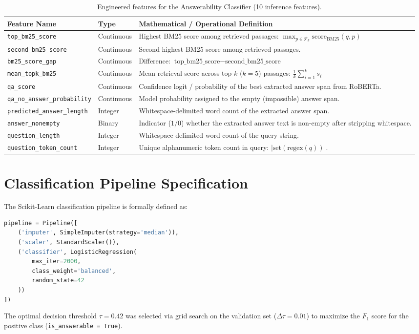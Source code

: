 \begin{table}[htbp]
  \centering
  \caption{Engineered features for the Answerability Classifier (10 inference features).}
  \label{tab:app_features}
  \small
  \begin{tabular}{llp{7.5cm}}
    \toprule
    \textbf{Feature Name} & \textbf{Type} & \textbf{Mathematical / Operational Definition} \\
    \midrule
    \texttt{top\_bm25\_score} & Continuous & Highest BM25 score among retrieved passages: $\max_{p \in \mathcal{P}_k} \text{score}_{\text{BM25}}(q, p)$ \\
    \texttt{second\_bm25\_score} & Continuous & Second highest BM25 score among retrieved passages. \\
    \texttt{bm25\_score\_gap} & Continuous & Difference: $\text{top\_bm25\_score} - \text{second\_bm25\_score}$ \\
    \texttt{mean\_topk\_bm25} & Continuous & Mean retrieval score across top-$k$ ($k=5$) passages: $\frac{1}{k}\sum_{i=1}^k s_i$ \\
    \texttt{qa\_score} & Continuous & Confidence logit / probability of the best extracted answer span from RoBERTa. \\
    \texttt{qa\_no\_answer\_probability} & Continuous & Model probability assigned to the empty (impossible) answer span. \\
    \texttt{predicted\_answer\_length} & Integer & Whitespace-delimited word count of the extracted answer span. \\
    \texttt{answer\_nonempty} & Binary & Indicator ($1/0$) whether the extracted answer text is non-empty after stripping whitespace. \\
    \texttt{question\_length} & Integer & Whitespace-delimited word count of the query string. \\
    \texttt{question\_token\_count} & Integer & Unique alphanumeric token count in query: $|\text{set}(\text{regex}(q))|$. \\
    \bottomrule
  \end{tabular}
\end{table}

\section{Classification Pipeline Specification}
\label{sec:app_pipeline}

The Scikit-Learn classification pipeline is formally defined as:
\begin{lstlisting}[language=Python]
pipeline = Pipeline([
    ('imputer', SimpleImputer(strategy='median')),
    ('scaler', StandardScaler()),
    ('classifier', LogisticRegression(
        max_iter=2000,
        class_weight='balanced',
        random_state=42
    ))
])
\end{lstlisting}
The optimal decision threshold $\tau = 0.42$ was selected via grid search on the validation set ($\Delta \tau = 0.01$) to maximize the $F_1$ score for the positive class (\texttt{is\_answerable = True}).

